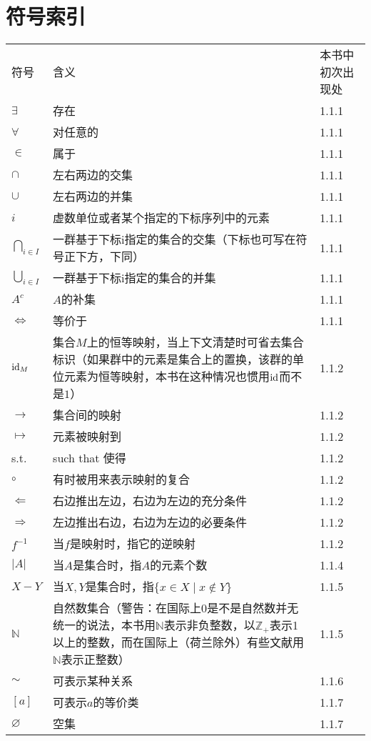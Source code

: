 \chapter*{符号索引}
\begin{longtable}{lp{.6\linewidth}l}
	符号 & 含义 & 本书中初次出现处 \\
	$\exists$ & 存在 & 1.1.1\\
	$\forall$ & 对任意的 & 1.1.1\\
	$\in$ & 属于 & 1.1.1\\
	$\cap$ & 左右两边的交集 & 1.1.1\\
	$\cup$ & 左右两边的并集 & 1.1.1\\
	$i$ & 虚数单位或者某个指定的下标序列中的元素 & 1.1.1\\
	$\bigcap_{i\in I}$ & 一群基于下标i指定的集合的交集（下标也可写在符号正下方，下同） & 1.1.1\\
	$\bigcup_{i \in I}$ & 一群基于下标i指定的集合的并集 & 1.1.1\\
	$A^c$ & $A$的补集 & 1.1.1\\
	$\Leftrightarrow$ & 等价于 & 1.1.1\\
	$\operatorname{id}_M$ & 集合$M$上的恒等映射，当上下文清楚时可省去集合标识（如果群中的元素是集合上的置换，该群的单位元素为恒等映射，本书在这种情况也惯用$\operatorname{id}$而不是$1$）& 1.1.2\\
	$\rightarrow$ & 集合间的映射 & 1.1.2\\
	$\mapsto$ & 元素被映射到 & 1.1.2\\
	s.t. & such that 使得 & 1.1.2\\
	$\circ$ & 有时被用来表示映射的复合 & 1.1.2\\
	$\Leftarrow$ & 右边推出左边，右边为左边的充分条件 & 1.1.2\\
	$\Rightarrow$ & 左边推出右边，右边为左边的必要条件 & 1.1.2\\
	$f^{-1}$ & 当$f$是映射时，指它的逆映射 & 1.1.2\\
	$|A|$ & 当$A$是集合时，指$A$的元素个数 & 1.1.4\\
	$X-Y$ & 当$X,Y$是集合时，指$\{x\in X\mid x\notin Y\}$ & 1.1.5\\
	$\mathbb{N}$ & 自然数集合（警告：在国际上$0$是不是自然数并无统一的说法，本书用$\mathbb{N}$表示非负整数，以$\mathbb{Z}_+$表示1以上的整数，而在国际上（荷兰除外）有些文献用$\mathbb{N}$表示正整数）& 1.1.5\\
	$\sim$ & 可表示某种关系 & 1.1.6\\
	$[a]$ & 可表示$a$的等价类 & 1.1.7\\
	$\varnothing$ & 空集& 1.1.7\\

\end{longtable}

